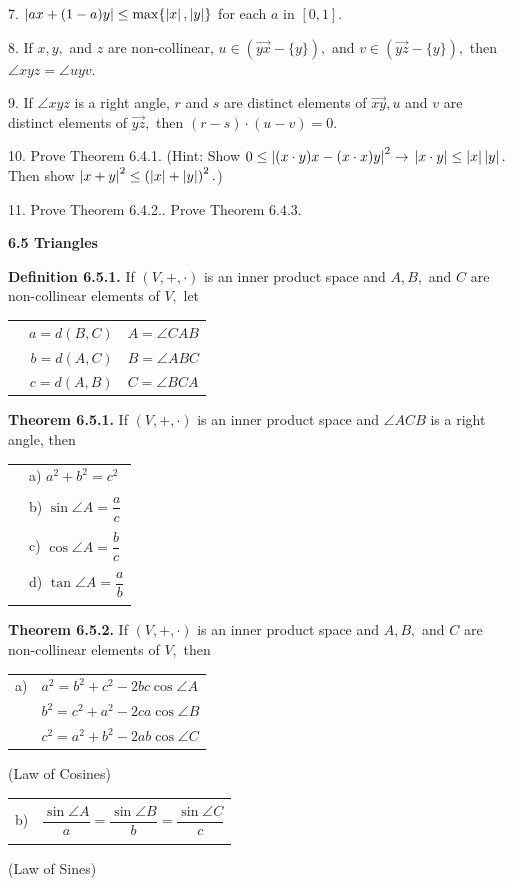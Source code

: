 7. $\left|ax + (1 - a)y\right| \leq \max \{ \left|x\right|,\left|y\right|\}$ for each $a$ in $[0,1].$\nl

8. If $x,y,$ and $z$ are non-collinear, $u\in (\overrightarrow{yx} -\{y\}),$ and $v\in(\overrightarrow{yz} -\{y\}),$ then  $\angle xyz = \angle uyv.$ \nl

9. 	If $\angle xyz$ is a right angle, $r$ and $s$ are distinct elements of $\overrightarrow{xy}, u$ and $v$ are distinct elements of $\overrightarrow{yz},$ then $(r - s)\cdot (u - v) = 0.$\nl

10. Prove Theorem 6.4.1. (Hint: Show $0 \leq \left|(x\cdot y)x - (x\cdot x)y\right|^{2} \to     $\nl
$\left|x\cdot y\right| \leq \left|x\right|\left|y\right|.$  Then show $\left|x + y\right|^{2} \leq \left(\left|x\right| + \left|y\right|\right)^{2}.$)\nl

11. Prove Theorem 6.4.2.. Prove Theorem 6.4.3.\nl

\newpage
\textbf{6.5 Triangles} \nl

\textbf{Definition 6.5.1.} If $(V,+,\cdot)$ is an inner product space and $A, B,$ and
$C$ are non-collinear elements of $V,$ let\nl
\begin{tabular}{r r l}
&$a = d(B, C)$&$A = \angle CAB$\\
&$b = d(A, C)$&$B = \angle ABC$\\
&$c = d(A, B)$&$C = \angle BCA$\\
\end{tabular}\nl


\textbf{Theorem 6.5.1.} If $(V,+,\cdot)$ is an inner product space and $\angle ACB$ is a right angle, then\nl
\begin{tabular}{r l}
&a) $a^{2} + b^{2} = c^{2}$\\
&\\
&b) $\sin\angle A = \dfrac{a}{c}$\\
&\\
&c) $\cos\angle A = \dfrac{b}{c}$\\
&\\
&d) $\tan\angle A = \dfrac{a}{b}$\\
&\\
\end{tabular}\nl

\textbf{Theorem 6.5.2.} If $(V,+,\cdot)$ is an inner product space and $A, B,$ and $C$ are non-collinear elements of $V,$ then\nl

\begin{tabular}{r l}
a) &$a^{2} = b^{2} + c^{2} - 2bc\cos\angle A$\\
&$b^{2} = c^{2} + a^{2} -2ca\cos\angle B$\\
&$c^{2} = a^{2} + b^{2} -2ab\cos\angle C$\\
\end{tabular}(Law of Cosines)\\
\begin{tabular}{r l}
&\\
b) &$\dfrac{\sin\angle A}{a} = \dfrac{\sin\angle B}{b} = \dfrac{\sin\angle C}{c}$\\
&\\
\end{tabular}(Law of Sines)\\

